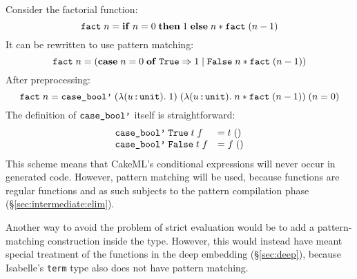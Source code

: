 Consider the factorial function:
%
  \[ \texttt{\textup{fact}}\;n = \mathtt{\mathbf{if}}\;n = 0\;\mathtt{\mathbf{then}}\;1\;\mathtt{\mathbf{else}}\;n * \texttt{\textup{fact}}\;(n - 1) \]
%
It can be rewritten to use pattern matching:
%
  \[ \texttt{\textup{fact}}\;n = (\mathtt{\mathbf{case}}\;n = 0\;\mathtt{\mathbf{of}}\;\texttt{\textup{True}} \Rightarrow 1\mid\texttt{\textup{False}}\;n * \texttt{\textup{fact}}\;(n - 1)) \]
%
After preprocessing:
%
  \[ \texttt{\textup{fact}}\;n = \texttt{\textup{case\_bool'}}\;(\lambda (u \mathbin{:\!\!:} \texttt{\textup{unit}}).\;1)\;(\lambda (u \mathbin{:\!\!:} \texttt{\textup{unit}}).\;n * \texttt{\textup{fact}}\;(n - 1))\;(n = 0) \]
%
The definition of $\texttt{\textup{case\_bool'}}$ itself is straightforward:
  \[
  \begin{array}{ll}
    \texttt{\textup{case\_bool'}}\;\texttt{\textup{True}}\;t\;f &= t\;() \\
    \texttt{\textup{case\_bool'}}\;\texttt{\textup{False}}\;t\;f &= f\;()
  \end{array}
  \]
%
This scheme means that CakeML's conditional expressions will never occur in generated code.
However, pattern matching will be used, because  functions are regular functions and as such subjects to the pattern compilation phase (§\ref{sec:intermediate:elim}).

Another way to avoid the problem of strict evaluation would be to add a pattern-matching construction inside the  type.
However, this would instead have meant special treatment of the  functions in the deep embedding (§\ref{sec:deep}), because Isabelle's \texttt{term} type also does not have pattern matching.